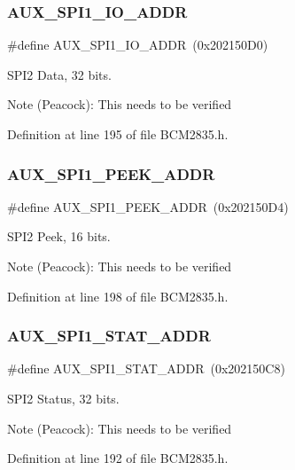 \subsubsection{\texorpdfstring{A\+U\+X\+\_\+\+S\+P\+I1\+\_\+\+I\+O\+\_\+\+A\+D\+DR}{AUX\_SPI1\_IO\_ADDR}}
{\footnotesize\ttfamily \#define A\+U\+X\+\_\+\+S\+P\+I1\+\_\+\+I\+O\+\_\+\+A\+D\+DR~(0x202150\+D0)}



S\+P\+I2 Data, 32 bits. 

\begin{DoxyNote}{Note}
(Peacock)\+: This needs to be verified 
\end{DoxyNote}


Definition at line 195 of file B\+C\+M2835.\+h.

\mbox{\label{group__SPI_ga4f35d0db4cc890579d44879d06967f6c}} 
\subsubsection{\texorpdfstring{A\+U\+X\+\_\+\+S\+P\+I1\+\_\+\+P\+E\+E\+K\+\_\+\+A\+D\+DR}{AUX\_SPI1\_PEEK\_ADDR}}
{\footnotesize\ttfamily \#define A\+U\+X\+\_\+\+S\+P\+I1\+\_\+\+P\+E\+E\+K\+\_\+\+A\+D\+DR~(0x202150\+D4)}



S\+P\+I2 Peek, 16 bits. 

\begin{DoxyNote}{Note}
(Peacock)\+: This needs to be verified 
\end{DoxyNote}


Definition at line 198 of file B\+C\+M2835.\+h.

\mbox{\label{group__SPI_ga35cdf7d5e580feb11441cebbf94d2c1f}} 
\subsubsection{\texorpdfstring{A\+U\+X\+\_\+\+S\+P\+I1\+\_\+\+S\+T\+A\+T\+\_\+\+A\+D\+DR}{AUX\_SPI1\_STAT\_ADDR}}
{\footnotesize\ttfamily \#define A\+U\+X\+\_\+\+S\+P\+I1\+\_\+\+S\+T\+A\+T\+\_\+\+A\+D\+DR~(0x202150\+C8)}



S\+P\+I2 Status, 32 bits. 

\begin{DoxyNote}{Note}
(Peacock)\+: This needs to be verified 
\end{DoxyNote}


Definition at line 192 of file B\+C\+M2835.\+h.

